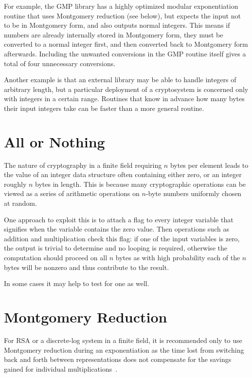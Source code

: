For example, the GMP library has a highly optimized modular exponentiation
routine that uses Montgomery reduction (see below),
but expects the input not to be
in Montgomery form, and also outputs normal integers.
This means if numbers are already internally stored in Montgomery form,
they must be converted to a normal integer first, and then converted
back to Montgomery form afterwards. Including the unwanted conversions in
the GMP routine itself gives a total of four unnecessary conversions.

Another example is that an external library may be able to handle integers
of arbitrary length, but a particular deployment of a cryptosystem is
concerned only with integers in a certain range. Routines that know
in advance how many bytes their input integers take can be faster than
a more general routine.

\section{All or Nothing}

The nature of cryptography in a finite field requiring $n$ bytes per element
leads to the value of an integer data structure
often containing either zero, or an integer roughly $n$ bytes in length.
This is because many cryptographic operations can be viewed as a series of
arithmetic operations on $n$-byte numbers uniformly chosen at random.

One approach to exploit this is to attach a flag to every integer variable
that signifies when the variable contains the zero value. Then operations
such as addition and multiplication check this flag: if one of the input
variables is zero, the output is trivial to determine and no looping
is required, otherwise the computation should proceed on all $n$ bytes as
with high probability each of the $n$ bytes will be nonzero and thus
contribute to the result.

In some cases it may help to test for one as well.

\section{Montgomery Reduction}

For RSA or a discrete-log system in a finite field, it is recommended
only to use Montgomery reduction during an exponentiation
as the time lost from switching back and forth between representations
does not compensate for the savings gained for individual multiplications~\cite{handbook}.

